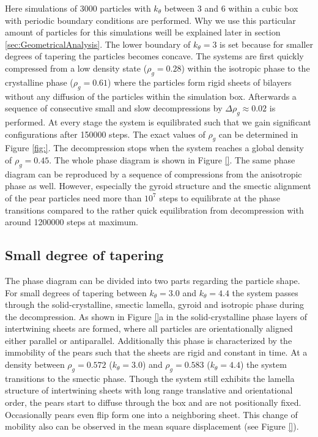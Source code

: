 \documentclass[epj,onecolumn]{webofc}
\begin{document}
Here simulations of 3000 particles with $k_{\theta}$ between $3$ and $6$ within a cubic box with periodic boundary conditions are performed. Why we use this particular amount of particles for this simulations weill be explained 
later in section \ref{sec:GeometricalAnalysis}. The lower boundary of $k_{\theta}=3$ is set because for smaller degrees of tapering the particles becomes concave. The systems are first quickly compressed from a low density 
state ($\rho_g=0.28$) within the isotropic phase to the crystalline phase ($\rho_g=0.61$) where the particles form rigid sheets of bilayers without any diffusion of the particles within the simulation box. Afterwards a sequence of 
consecutive small and slow decompressions by $\Delta\rho_g\approx 0.02$ is performed. At every stage the system is equilibrated such that we gain significant configurations after 150000 steps. The exact values of $\rho_g$ 
can be determined in Figure \ref{fig:}. The decompression stops when the system reaches a global density of $\rho_g=0.45$. The whole phase diagram is shown in Figure \ref{}. The same phase diagram can be reproduced by a 
sequence of compressions from the anisotropic phase as well. However, especially the gyroid structure and the smectic alignment of the pear particles need more than $10^7$ steps to equilibrate at the phase transitions 
compared to the rather quick equilibration from decompression with around 1200000 steps at maximum.

\subsection{Small degree of tapering}
\label{sec:Small_k_theta}

The phase diagram can be divided into two parts regarding the particle shape. For small degrees of tapering between $k_{\theta}=3.0$ and $k_{\theta}=4.4$ the system passes through the solid-crystalline, smectic lamella, 
gyroid and isotropic phase during the decompression. As shown in Figure \ref{}a in the solid-crystalline phase layers of intertwining sheets are formed, where all particles are  orientationally aligned either parallel or antiparallel. 
Additionally this phase is characterized by the immobility of the pears such that the sheets are rigid and constant in time. At a density between $\rho_g=0.572$ ($k_{\theta}=3.0$) and $\rho_g=0.583$ ($k_{\theta}=4.4$) the 
system transitions  to the smectic phase.  Though the system still exhibits the lamella structure of intertwining sheets with long range translative and orientational order, the pears start to diffuse through the box and are not 
positionally fixed. Occasionally pears even flip form one into a neighboring sheet. This change of mobility also can be observed in the mean square displacement (see Figure \ref{}).\\
\end{document}
